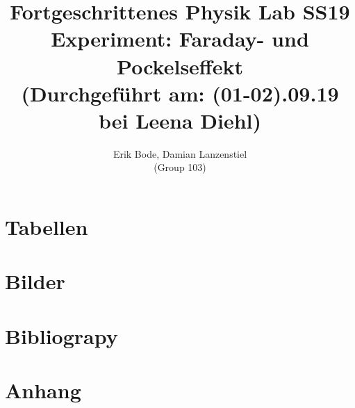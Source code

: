 \documentclass[30pt,a4paper]{article}
\title{
	\large Fortgeschrittenes Physik Lab	SS19 \\[4mm]
	\textbf{\LARGE Experiment: Faraday- und Pockelseffekt
	} \\[4mm]
	(Durchgeführt am: (01-02).09.19 bei Leena Diehl) \\}
\author{Erik Bode, Damian Lanzenstiel \\ (Group 103)}
\begin{document}
	
	\begin{titlepage}
		\maketitle
		\vspace{2cm}
		\begin{abstract}
	
		\end{abstract}
	\end{titlepage}
	\newpage
	\tableofcontents
	\newpage
	
	
		
	
	
	
	
	
	
	\section{Tabellen}
	\listoftables
	\section{Bilder}
	\listoffigures
	\section{Bibliograpy}
	
	
	\section{Anhang}
	
\end{document}
